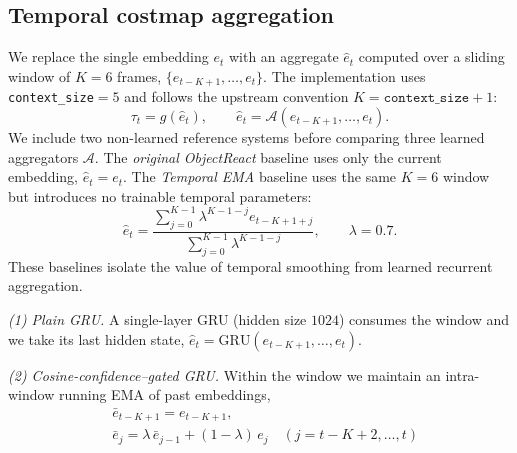 \documentclass[conference]{IEEEtran}
\begin{document}
\subsection{Temporal costmap aggregation}
We replace the single embedding $e_t$ with an aggregate $\hat{e}_t$ computed over a sliding window of $K{=}6$ frames, $\{e_{t-K+1},\dots,e_t\}$. The implementation uses \texttt{context\_size}$=5$ and follows the upstream convention $K=\texttt{context\_size}+1$:
\begin{equation}
\tau_t = g\!\left(\hat{e}_t\right), \qquad \hat{e}_t = \mathcal{A}\!\left(e_{t-K+1},\dots,e_t\right).
\end{equation}
We include two non-learned reference systems before comparing three learned
aggregators $\mathcal{A}$. The \emph{original ObjectReact} baseline uses only
the current embedding, $\hat e_t=e_t$. The \emph{Temporal EMA} baseline uses
the same $K{=}6$ window but introduces no trainable temporal parameters:
\begin{equation}
\hat e_t =
\frac{\sum_{j=0}^{K-1}\lambda^{K-1-j}e_{t-K+1+j}}
     {\sum_{j=0}^{K-1}\lambda^{K-1-j}},
\qquad \lambda=0.7.
\end{equation}
These baselines isolate the value of temporal smoothing from learned recurrent
aggregation.

\emph{(1) Plain GRU.} A single-layer GRU (hidden size $1024$) consumes the window and we take its last hidden state, $\hat{e}_t = \mathrm{GRU}(e_{t-K+1},\dots,e_t)$.

\emph{(2) Cosine-confidence--gated GRU.}
Within the window we maintain an intra-window running EMA of past
embeddings,
\begin{equation}
\begin{aligned}
&\bar{e}_{t-K+1} = e_{t-K+1}, \\
&\bar{e}_{j} = \lambda\,\bar{e}_{j-1} + (1-\lambda)\,e_{j} \quad (j = t{-}K{+}2,\dots,t)
\end{aligned}
\end{equation}
\end{document}
